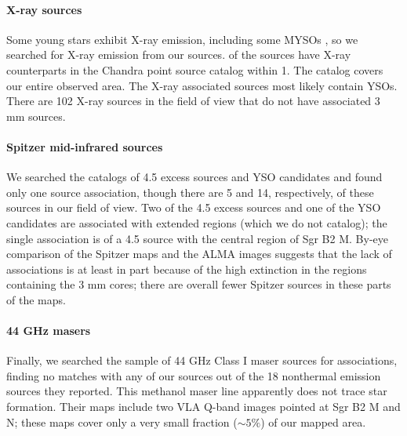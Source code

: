 \documentclass[twocolumn]{aastex61}
\begin{document}
\paragraph{X-ray sources}
Some young stars exhibit X-ray emission, including some MYSOs
\citep[e.g.,][]{Townsley2014a}, so we searched for X-ray emission from our
sources.  \nxraymatch of the sources have X-ray counterparts in the
\citet{Muno2009a} Chandra point source catalog within 1\arcsec.  The
\citet{Muno2009a} catalog covers our entire observed area.  The X-ray
associated sources most likely contain YSOs.  There are 102 X-ray sources in
the field of view that do not have associated 3 mm sources.

\paragraph{Spitzer mid-infrared sources}
We searched the \citet{Yusef-Zadeh2009a} catalogs of 4.5 \um excess sources and
YSO candidates and found only one source association, though there are 5 and
14, respectively, of these sources in our field of view.  Two of the 4.5 \um
excess sources and one of the YSO candidates are associated with extended \hii
regions (which we do not catalog); the single association is of a 4.5 \um source with the central region
of Sgr B2 M. By-eye comparison of the Spitzer maps and the ALMA images suggests
that the lack of associations is at least in part because of the high
extinction in the regions containing the 3 mm cores; there are overall fewer
Spitzer sources in these parts of the maps.

\paragraph{44 GHz \methanol masers}
Finally, we searched the \citet{Mehringer1997a} sample of 44 GHz Class I
\methanol maser sources for associations, finding no matches with any of our
sources out of the 18 nonthermal \methanol emission sources they reported.
This methanol maser line apparently does not trace star formation.
Their maps include two VLA Q-band images pointed at Sgr B2 M and N; these
maps cover only a very small fraction ($\sim5\%$) of our mapped area.
\end{document}
